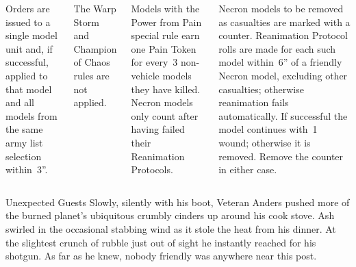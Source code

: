 \begin{columns}
%

\vspace{-9pt}%
 Orders are issued to a single
model unit and, if successful, applied to that model and all models
from the same army list selection within~3''.

\vspace{-9pt}%
 The Warp Storm
and Champion of Chaos rules are not applied.



\vspace{-9pt}%
 Models with the Power from Pain
special rule earn one Pain Token for every~3 non-vehicle models they
have killed. Necron models only count after having failed their
Reanimation Protocols.

\vspace{-9pt}%
 Necron models to be removed as casualties
are marked with a counter.  Reanimation Protocol rolls are made for
each such model within~6'' of a friendly Necron model, excluding other
casualties; otherwise reanimation fails automatically.  If successful
the model continues with~1 wound; otherwise it is removed.  Remove the
counter in either case.

\end{columns}

\begin{story}{0.35in}{Unexpected Guests}%
  Slowly, silently with his boot, Veteran Anders pushed more of the
  burned planet's ubiquitous crumbly cinders up around his cook stove.
  Ash swirled in the occasional stabbing wind as it stole the heat
  from his dinner.  At the slightest crunch of rubble just out of
  sight he instantly reached for his shotgun.  As far as he knew,
  nobody friendly was anywhere near this post.
\end{story}
